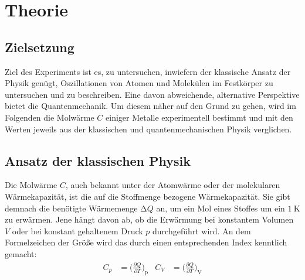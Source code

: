 \section{Theorie}%
\label{sec:Theorie}
\subsection{Zielsetzung}
    Ziel des Experiments ist es, zu untersuchen, inwiefern der klassische Ansatz der Physik genügt, Oszillationen von 
    Atomen und Molekülen im Festkörper zu untersuchen und zu beschreiben. 
    Eine davon abweichende, alternative Perspektive bietet die Quantenmechanik. 
    Um diesem näher auf den Grund zu gehen, wird im Folgenden die Molwärme $C$ einiger Metalle experimentell bestimmt und 
    mit den Werten jeweils aus der klassischen und quantenmechanischen Physik verglichen. 
\subsection{Ansatz der klassischen Physik}
    Die Molwärme $C$, auch bekannt unter der Atomwärme oder der molekularen Wärmekapazität, ist die auf die 
    Stoffmenge bezogene Wärmekapazität. 
    Sie gibt demnach die benötigte Wärmemenge $\increment Q$ an, um ein Mol eines Stoffes um ein $\SI{1}{\kelvin}$ zu erwärmen.
    Jene hängt davon ab, ob die Erwärmung bei konstantem Volumen $V$ oder bei konstant gehaltenem Druck $p$ durchgeführt 
    wird. An dem Formelzeichen der Größe wird das durch einen entsprechenden Index kenntlich gemacht: 
    \begin{align*}
        C_{p} &= \biggl(\frac{\partial Q}{\partial T}\biggr)_{\text{p}} &
        C_{V} &= \biggl(\frac{\partial Q}{\partial T}\biggr)_{\text{V}} \\
    \end{align*}


